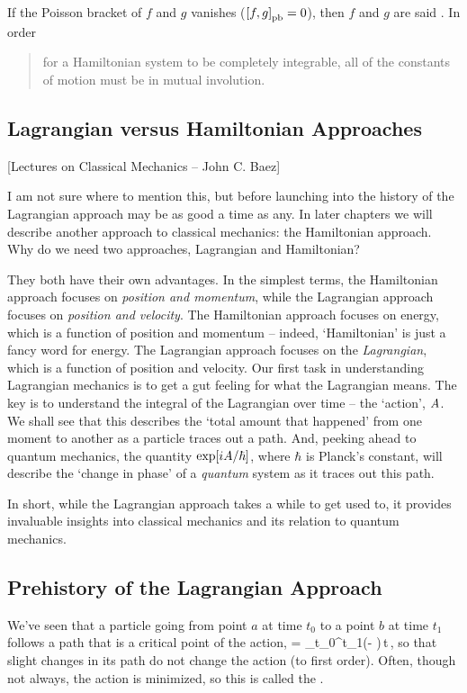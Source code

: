 If the Poisson bracket of $f$ and $g$ vanishes ($\left[{f,g}\right]_{\text{pb}} = 0$), then $f$ and $g$ are said . In order 
\begin{quote}
for a Hamiltonian system to be completely integrable, all of the constants of motion must be in mutual involution.
\end{quote}


\subsection{Lagrangian versus Hamiltonian Approaches}
[Lectures on Classical Mechanics -- John C. Baez]

I am not sure where to mention this, but before launching into the history of the Lagrangian approach may be as good a time as any. In later chapters we will describe another approach to classical mechanics: the Hamiltonian approach. Why do we need two approaches, Lagrangian and Hamiltonian?

They both have their own advantages. In the simplest terms, the Hamiltonian approach focuses on \emph{position and momentum}, while the Lagrangian approach focuses on \emph{position and velocity}. The Hamiltonian approach focuses on energy, which is a function of position and momentum -- indeed, `Hamiltonian' is just a fancy word for energy. The Lagrangian approach focuses on the \emph{Lagrangian}, which is a function of position and velocity. Our first task in understanding Lagrangian mechanics is to get a gut feeling for what the Lagrangian means. The key is to understand the integral of the Lagrangian over time -- the `action', $A$. We shall see that this describes the `total amount that happened' from one moment to another as a particle traces out a path. And, peeking ahead to quantum mechanics, the quantity $\exp\!\left[{iA/\hbar}\right]$, where $\hbar$ is Planck's constant, will describe the `change in phase' of a \emph{quantum} system as it traces out this path.

In short, while the Lagrangian approach takes a while to get used to, it provides invaluable insights into classical mechanics and its relation to quantum mechanics.


\subsection{Prehistory of the Lagrangian Approach}
We've seen that a particle going from point $a$ at time $t_0$ to a point $b$ at time $t_1$ follows a path that is a critical point of the action,
\beq
\action = \int_{t_0}^{t_1}(\ken - \pen)\,\dx t\,,
\eeq
so that slight changes in its path do not change the action (to first order). Often, though not always, the action is minimized, so this is called the .

